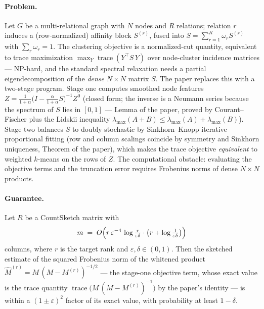 \paragraph{Problem.}
Let $G$ be a multi-relational graph with $N$ nodes and $R$ relations;
relation $r$ induces a (row-normalized) affinity block $S^{(r)}$, fused
into $S = \sum_{r=1}^R \omega_r S^{(r)}$ with $\sum_r \omega_r = 1$.
The clustering objective is a normalized-cut quantity, equivalent to
trace maximization $\max_Y \operatorname{trace}(Y^{\!\top} S\,Y)$ over
node-cluster incidence matrices --- NP-hard, and the standard spectral
relaxation needs a partial eigendecomposition of the \emph{dense}
$N \times N$ matrix $S$. The paper replaces this with a two-stage
program. Stage one computes smoothed node features $Z =
\frac{1}{1+\alpha}\bigl(I - \tfrac{\alpha}{1+\alpha}S\bigr)^{-1} Z^0$
(closed form; the inverse is a Neumann series because the spectrum of
$S$ lies in $[0,1]$ --- Lemma of the paper, proved by Courant--Fischer
plus the Lidskii inequality $\lambda_{\max}(A+B) \le \lambda_{\max}(A)
+ \lambda_{\max}(B)$). Stage two balances $S$ to doubly stochastic by
Sinkhorn--Knopp iterative proportional fitting (row and column
scalings coincide by symmetry and Sinkhorn uniqueness, Theorem of the
paper), which makes the trace objective \emph{equivalent} to weighted
$k$-means on the rows of $Z$. The computational obstacle: evaluating
the objective terms and the truncation error requires Frobenius norms
of dense $N \times N$ products.

\paragraph{Guarantee.}

\begin{corollary}\label{cor:cor-mrg-sketch}
Let $R$ be a CountSketch matrix with
\[
m \;=\; O\Bigl(r\,\varepsilon^{-4}\,
\log\tfrac{r}{\varepsilon\delta}\cdot\bigl(r + \log\tfrac{1}{\varepsilon
\delta}\bigr)\Bigr)
\]
columns, where $r$ is the target rank and $\varepsilon,\delta \in
(0,1)$. Then the sketched estimate of the squared Frobenius norm of
the whitened product $\hat{M}^{(r)} = M\,(M - M^{(r)})^{-1/2}$ --- the
stage-one objective term, whose exact value is the trace quantity
$\operatorname{trace}\bigl(M\,(M-M^{(r)})^{-1}\bigr)$ by the paper's
identity --- is within a $(1\pm\varepsilon)^2$ factor of its exact
value, with probability at least $1-\delta$. \eop
\end{corollary}

